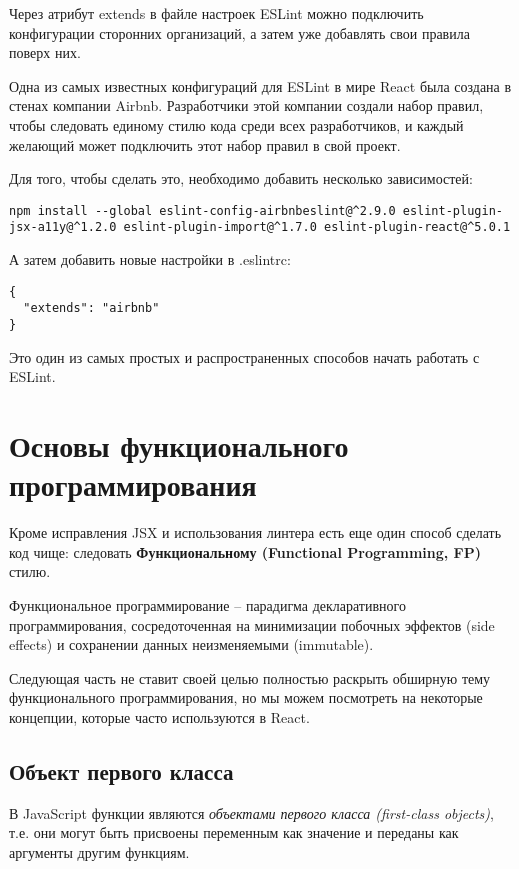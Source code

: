 Через атрибут extends в файле настроек ESLint можно подключить конфигурации сторонних организаций, а затем уже добавлять свои правила поверх них.

Одна из самых известных конфигураций для ESLint в мире React была создана в стенах компании Airbnb. Разработчики этой компании создали набор правил, чтобы следовать единому стилю кода среди всех разработчиков, и каждый желающий может подключить этот набор правил в свой проект.

Для того, чтобы сделать это, необходимо добавить несколько зависимостей:

\begin{lstlisting}
npm install --global eslint-config-airbnbeslint@^2.9.0 eslint-plugin-jsx-a11y@^1.2.0 eslint-plugin-import@^1.7.0 eslint-plugin-react@^5.0.1
\end{lstlisting}

А затем добавить новые настройки в .eslintrc:

\begin{lstlisting}
{
  "extends": "airbnb"
}
\end{lstlisting}

Это один из самых простых и распространенных способов начать работать с ESLint.


\section{Основы функционального программирования}

Кроме исправления JSX и использования линтера есть еще один способ сделать код чище: следовать \textbf{Функциональному (Functional Programming, FP)} стилю.

Функциональное программирование -- парадигма декларативного программирования, сосредоточенная на минимизации побочных эффектов (side effects) и сохранении данных неизменяемыми (immutable).

Следующая часть не ставит своей целью полностью раскрыть обширную тему функционального программирования, но мы можем посмотреть на некоторые концепции, которые часто используются в React. 

\subsection{Объект первого класса}

В JavaScript функции являются \textit{объектами первого класса (first-class objects)}, т.е. они могут быть присвоены переменным как значение и переданы как аргументы другим функциям.

